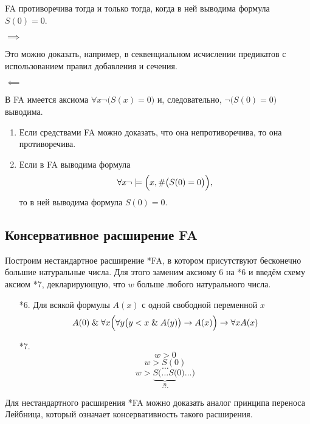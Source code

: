 \begin{lemma}
	FA противоречива тогда и только тогда, когда в ней выводима формула $ S(0) = 0 $.
\end{lemma}

\begin{iproof}
	\item $ \implies $

		Это можно доказать, например, в секвенциальном исчислении предикатов с использованием правил добавления и сечения.
	\item $ \impliedby $

		В FA имеется аксиома $ \forall x \neg \bigl( S(x) = 0 \bigr) $ и, следовательно, $ \neg \bigl( S(0) = 0 \bigr) $ выводима.
\end{iproof}

\begin{theorem}
	\hfill
	\begin{enumerate}
		\item Если средствами FA можно доказать, что она непротиворечива, то она противоречива.
		\item Если в FA выводима формула
			$$ \forall x \neg \models \Bigl( x, \# \bigl( S(0) = 0 \bigr) \Bigr), $$
			то в ней выводима формула $ S(0) = 0 $.
	\end{enumerate}
\end{theorem}

\subsection*{Консервативное расширение FA}

Построим нестандартное расширение *FA, в котором присутствуют бесконечно большие натуральные числа.
Для этого заменим аксиому 6 на *6 и введём схему аксиом *7, декларирующую, что $ w $ больше любого натурального числа.
\begin{enumerate}
	\item[*6.] Для всякой формулы $ A(x) $ с одной свободной переменной $ x $
	$$ A(0) \mathrel\& \forall x \Bigl( \forall y \bigl( y < x \mathrel\& A(y) \bigr) \to A(x) \Bigr) \to \forall x A(x) $$
	\item[*7.]
		$$ w > 0 $$
		$$ w > S(0) $$
		$$ \dots $$
		$$ w > \underbrace{S(\dots S(}_n 0) \dots) $$
		$$ \dots $$
\end{enumerate}

Для нестандартного расширения *FA можно доказать аналог принципа переноса Лейбница, который означает консервативность такого расширения.

